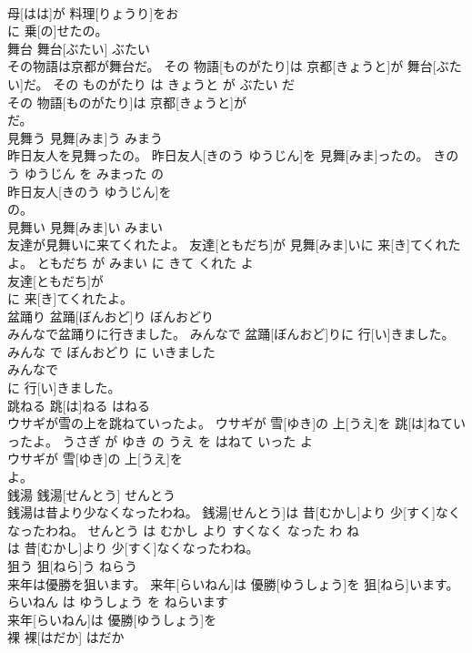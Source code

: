 \documentclass[8pt]{extreport}
\begin{document}
\begin{CJK}{UTF8}{min}
\\	母[はは]が 料理[りょうり]をお
\\	に 乗[の]せたの。			
\\	舞台	舞台[ぶたい]	ぶたい	
\\	その物語は京都が舞台だ。	その 物語[ものがたり]は 京都[きょうと]が 舞台[ぶたい]だ。	その ものがたり は きょうと が ぶたい だ	
\\	その 物語[ものがたり]は 京都[きょうと]が
\\	だ。			
\\	見舞う	見舞[みま]う	みまう	
\\	昨日友人を見舞ったの。	昨日友人[きのう ゆうじん]を 見舞[みま]ったの。	きのう ゆうじん を みまった の	
\\	昨日友人[きのう ゆうじん]を
\\	の。			
\\	見舞い	見舞[みま]い	みまい	
\\	友達が見舞いに来てくれたよ。	友達[ともだち]が 見舞[みま]いに 来[き]てくれたよ。	ともだち が みまい に きて くれた よ	
\\	友達[ともだち]が
\\	に 来[き]てくれたよ。			
\\	盆踊り	盆踊[ぼんおど]り	ぼんおどり	
\\	みんなで盆踊りに行きました。	みんなで 盆踊[ぼんおど]りに 行[い]きました。	みんな で ぼんおどり に いきました	
\\	みんなで
\\	に 行[い]きました。			
\\	跳ねる	跳[は]ねる	はねる	
\\	ウサギが雪の上を跳ねていったよ。	ウサギが 雪[ゆき]の 上[うえ]を 跳[は]ねていったよ。	うさぎ が ゆき の うえ を はねて いった よ	
\\	ウサギが 雪[ゆき]の 上[うえ]を
\\	よ。			
\\	銭湯	銭湯[せんとう]	せんとう	
\\	銭湯は昔より少なくなったわね。	銭湯[せんとう]は 昔[むかし]より 少[すく]なくなったわね。	せんとう は むかし より すくなく なった わ ね	
\\	は 昔[むかし]より 少[すく]なくなったわね。			
\\	狙う	狙[ねら]う	ねらう	
\\	来年は優勝を狙います。	来年[らいねん]は 優勝[ゆうしょう]を 狙[ねら]います。	らいねん は ゆうしょう を ねらいます	
\\	来年[らいねん]は 優勝[ゆうしょう]を
\\	裸	裸[はだか]	はだか	

\end{CJK}
\end{document}
